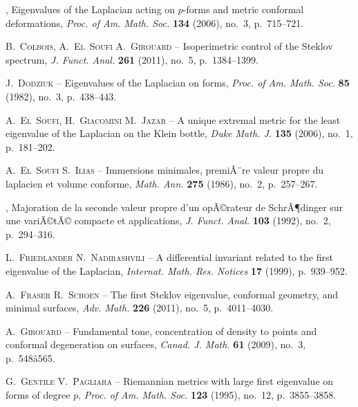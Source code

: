\documentclass[11pt,a4paper]{smfart}
\begin{document}
\begin{thebibliography}{{Mc}{G}93}
\bysame , {\og Eigenvalues of the {L}aplacian acting on $p$-forms and metric
  conformal deformations\fg}, \emph{Proc. of Am. Math. Soc.} \textbf{134}
  (2006), no.~3, p.~715--721.

{\scshape B.~Colbois, A.~El~Soufi {\normalfont \smfandname} A.~Girouard} --
  {\og Isoperimetric control of the {S}teklov spectrum\fg}, \emph{J. Funct.
  Anal.} \textbf{261} (2011), no.~5, p.~1384--1399.

{\scshape J.~Dodziuk} -- {\og Eigenvalues of the {L}aplacian on forms\fg},
  \emph{Proc. of Am. Math. Soc.} \textbf{85} (1982), no.~3, p.~438--443.

{\scshape A.~El~Soufi, H.~Giacomini {\normalfont \smfandname} M.~Jazar} -- {\og
  A unique extremal metric for the least eigenvalue of the {L}aplacian on the
  {K}lein bottle\fg}, \emph{Duke Math. J.} \textbf{135} (2006), no.~1,
  p.~181--202.

{\scshape A.~El~Soufi {\normalfont \smfandname} S.~Ilias} -- {\og Immersions
  minimales, premiÃ¨re valeur propre du laplacien et volume conforme\fg},
  \emph{Math. Ann.} \textbf{275} (1986), no.~2, p.~257--267.

\bysame , {\og Majoration de la seconde valeur propre d'un opÃ©rateur de
  {S}chrÃ¶dinger sur une variÃ©tÃ© compacte et applications\fg}, \emph{J.
  Funct. Anal.} \textbf{103} (1992), no.~2, p.~294--316.

{\scshape L.~Friedlander {\normalfont \smfandname} N.~Nadirashvili} -- {\og A
  differential invariant related to the first eigenvalue of the
  {L}aplacian\fg}, \emph{Internat. Math. Res. Notices} \textbf{17} (1999),
  p.~939--952.

{\scshape A.~Fraser {\normalfont \smfandname} R.~Schoen} -- {\og The first
  {S}teklov eigenvalue, conformal geometry, and minimal surfaces\fg},
  \emph{Adv. Math.} \textbf{226} (2011), no.~5, p.~4011--4030.

{\scshape A.~Girouard} -- {\og Fundamental tone, concentration of density to
  points and conformal degeneration on surfaces\fg}, \emph{Canad. J. Math.}
  \textbf{61} (2009), no.~3, p.~548â565.

{\scshape G.~Gentile {\normalfont \smfandname} V.~Pagliara} -- {\og Riemannian
  metrics with large first eigenvalue on forms of degree $p$\fg}, \emph{Proc.
  of Am. Math. Soc.} \textbf{123} (1995), no.~12, p.~3855--3858.


\end{thebibliography}
\end{document}
